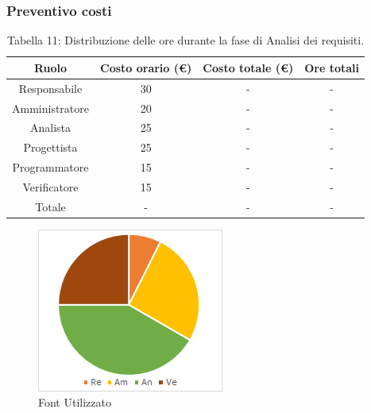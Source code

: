 \vspace{100pt}
\subsubsection{Preventivo costi}
\begin{table}[h]
	\setlength\extrarowheight{5pt}
	\centering
	\begin{tabularx}{\textwidth}{|c|c|c|c|}
		\hline
		\textbf{Ruolo} & \textbf{Costo orario (€)} & \textbf{Costo totale (€)} &\textbf{Ore totali}\\
		\hline
		Responsabile &30&-&- \\
		\hline
		Amministratore &20&-&- \\
		\hline
		Analista &25&-&- \\
		\hline
		Progettista &25&-&- \\
		\hline
		Programmatore &15&-&- \\
		\hline
		Verificatore &15&-&- \\
		\hline
		Totale &-&-&-\\
		\hline
	\end{tabularx}
    \vspace{10pt}
	\caption{Tabella 11: Distribuzione delle ore durante la fase di Analisi dei requisiti.}
\end{table}

\begin{figure}[H]
    \centering
    \includegraphics[scale=0.6]{img/grafi preventivo/torta/analisi.PNG}
    \caption{Font Utilizzato}
\end{figure}


